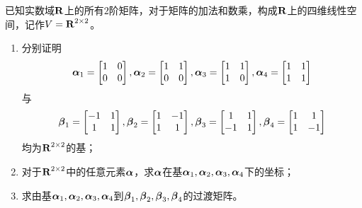 \begin{problem}
已知实数域\(\boldsymbol{\mathrm{R}}\)上的所有\(2\)阶矩阵，对于矩阵的加法和数乘，构成\(\boldsymbol{\mathrm{R}}\)上的四维线性空间，记作\(V=\boldsymbol{\mathrm{R}}^{2\times2}\)。
\begin{enumerate}
    \item {
          分别证明
          \begin{equation*}
              \boldsymbol{\alpha}_1=\begin{bmatrix}1&0\\0&0\end{bmatrix},
              \boldsymbol{\alpha}_2=\begin{bmatrix}1&1\\0&0\end{bmatrix},
              \boldsymbol{\alpha}_3=\begin{bmatrix}1&1\\1&0\end{bmatrix},
              \boldsymbol{\alpha}_4=\begin{bmatrix}1&1\\1&1\end{bmatrix}
          \end{equation*}
          与
          \begin{equation*}
              \boldsymbol{\beta}_1=\begin{bmatrix}-1&1\\1&1\end{bmatrix},
              \boldsymbol{\beta}_2=\begin{bmatrix}1&-1\\1&1\end{bmatrix},
              \boldsymbol{\beta}_3=\begin{bmatrix}1&1\\-1&1\end{bmatrix},
              \boldsymbol{\beta}_4=\begin{bmatrix}1&1\\1&-1\end{bmatrix}
          \end{equation*}
          均为\(\boldsymbol{\mathrm{R}}^{2\times2}\)的基；}
    \item 对于\(\boldsymbol{\mathrm{R}}^{2\times2}\)中的任意元素\(\boldsymbol{\alpha}\)，求\(\boldsymbol{\alpha}\)在基\(\boldsymbol{\alpha}_1,\boldsymbol{\alpha}_2,\boldsymbol{\alpha}_3,\boldsymbol{\alpha}_4\)下的坐标；
    \item 求由基\(\boldsymbol{\alpha}_1,\boldsymbol{\alpha}_2,\boldsymbol{\alpha}_3,\boldsymbol{\alpha}_4\)到\(\boldsymbol{\beta}_1,\boldsymbol{\beta}_2,\boldsymbol{\beta}_3,\boldsymbol{\beta}_4\)的过渡矩阵。
\end{enumerate}
\end{problem}
